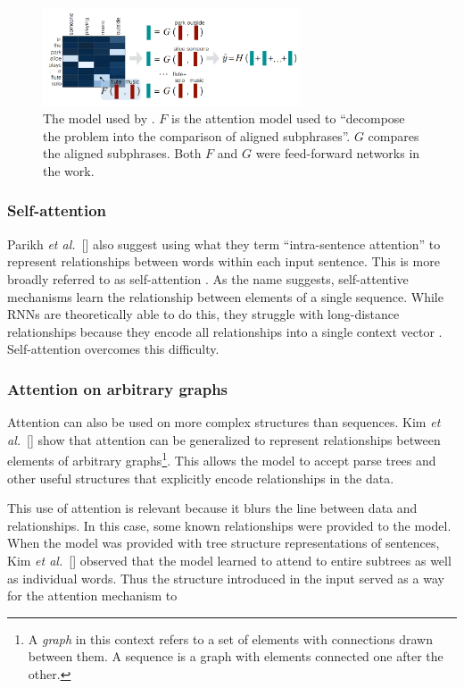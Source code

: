 \documentclass{article}
\newcommand{\etal}{\textit{et al.}}
\begin{document}
\begin{figure}
    \centering
    \includegraphics[width=3in]{figures/inference.png}
    \caption{The model used by \protect\cite{natural_language_inference}. $F$ is the attention model used to ``decompose the problem into the comparison of aligned subphrases''. $G$ compares the aligned subphrases. Both $F$ and $G$ were feed-forward networks in the work.}\label{figure:inference}
\end{figure}

\subsubsection{Self-attention}

Parikh \etal~[\citeyear{natural_language_inference}] also suggest using what they term ``intra-sentence attention'' to represent relationships between words within each input sentence. This is more broadly referred to as self-attention \cite{self_attentive_embedding,attn_all_you_need}. As the name suggests, self-attentive mechanisms learn the relationship between elements of a single sequence. While RNNs are theoretically able to do this, they struggle with long-distance relationships because they encode all relationships into a single context vector \cite{joint_align_translate}. Self-attention overcomes this difficulty.

\subsubsection{Attention on arbitrary graphs}

Attention can also be used on more complex structures than sequences. Kim \etal~[\citeyear{graphs}] show that attention can be generalized to represent relationships between elements of arbitrary graphs\footnote{A \textit{graph} in this context refers to a set of elements with connections drawn between them. A sequence is a graph with elements connected one after the other.}. This allows the model to accept parse trees and other useful structures that explicitly encode relationships in the data.

This use of attention is relevant because it blurs the line between data and relationships. In this case, some known relationships were provided to the model. When the model was provided with tree structure representations of sentences, Kim \etal~[\citeyear{graphs}] observed that the model learned to attend to entire subtrees as well as individual words. Thus the structure introduced in the input served as a way for the attention mechanism to
\end{document}
